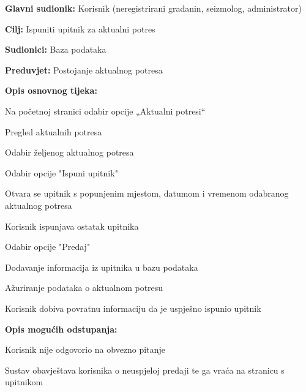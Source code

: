 			\noindent {}
			\begin{packed_item}
				
				\item \textbf{Glavni sudionik:} Korisnik (neregistrirani građanin, seizmolog, administrator)
				\item \textbf{Cilj:} Ispuniti upitnik za aktualni potres
				\item \textbf{Sudionici:} Baza podataka
				\item \textbf{Preduvjet:} Postojanje aktualnog potresa
				
				\item \textbf{Opis osnovnog tijeka:}
				
				\item[] \begin{packed_enum}
					\item Na početnoj stranici odabir opcije „Aktualni potresi“
					\item Pregled aktualnih potresa
					\item Odabir željenog aktualnog potresa
					\item Odabir opcije "Ispuni upitnik"
					\item Otvara se upitnik s popunjenim mjestom, datumom i vremenom odabranog aktualnog potresa
					\item Korisnik ispunjava ostatak upitnika
					\item Odabir opcije "Predaj"
					\item Dodavanje informacija iz upitnika u bazu podataka
					\item Ažuriranje podataka o aktualnom potresu
					\item Korisnik dobiva povratnu informaciju da je uspješno ispunio upitnik
				\end{packed_enum}
				
				\item  \textbf{Opis mogućih odstupanja:}
				
				\item[] \begin{packed_item}
					
					\item[6.a] Korisnik nije odgovorio na obvezno pitanje
					\item[] \begin{packed_enum}
						
						\item Sustav obavještava korisnika o neuspjeloj predaji te ga vraća na stranicu s upitnikom
						

\end{packed_enum}
\end{packed_item}
\end{packed_item}

